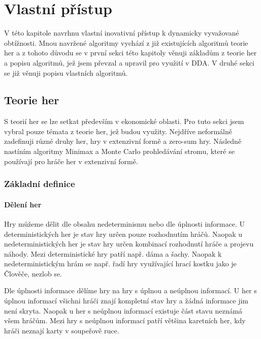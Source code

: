 \chapter{Vlastní přístup}

V této kapitole navrhnu vlastní inovativní přístup k dynamicky vyvažované obtížnosti. Mnou navržené algoritmy vychází z již existujících algoritmů teorie her a z tohoto důvodu se v první sekci této kapitoly věnuji základům z teorie her a popisu algoritmů, jež jsem převzal a upravil pro využití v DDA. V druhé sekci se již věnuji popisu vlastních algoritmů.

\section{Teorie her}

S teorií her se lze setkat především v ekonomické oblasti. Pro tuto sekci jsem vybral pouze témata z teorie her, jež budou využity. Nejdříve neformálně zadefinuji různé druhy her, hry v extenzivní formě a zero-sum hry. Následně nastíním algoritmy Minimax a Monte Carlo prohledávání stromu, které se používají pro hráče her v extenzivní formě.

\subsection{Základní definice}

\subsubsection{Dělení her}

Hry můžeme dělit dle obsahu nedeterminismu nebo dle úplnosti informace. U deterministických her je stav hry určen pouze rozhodnutím hráčů. Naopak u nedeterministických her je stav hry určen kombinací rozhodnutí hráče a projevu náhody. Mezi deterministické hry patří např. dáma a šachy. Naopak k nedeterministickým hrám se např. řadí hry využívající hrací kostku jako je Člověče, nezlob se.

Dle úplnosti informace dělíme hry na hry s úplnou a neúplnou informací. U her s úplnou informací všichni hráči znají kompletní stav hry a žádná informace jim není skryta. Naopak u her s neúplnou informací existuje část stavu neznámá všem hráčům. Mezi hry s neúplnou informací patří většina karetních her, kdy hráči neznají karty v soupeřově ruce.

